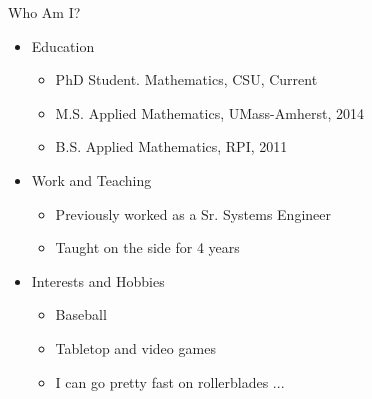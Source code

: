 {}\documentclass[letterpaper,
compress,
xcolor=x11names,
]{beamer}
\begin{document}
\begin{frame}{Who Am I?}
	\begin{itemize}
		\item Education
		\begin{itemize}
			\item PhD Student. Mathematics, CSU, Current
			\item M.S. Applied Mathematics, UMass-Amherst, 2014
			\item B.S. Applied Mathematics, RPI, 2011
		\end{itemize}
		\item Work and Teaching
		\begin{itemize}
			\item Previously worked as a Sr. Systems Engineer
			\item Taught on the side for 4 years
		\end{itemize}
		\item<2-> Interests and Hobbies
		\begin{itemize}
			\item Baseball
			\item Tabletop and video games
			\item<3-> I can go pretty fast on rollerblades ... 
		\end{itemize}
	\end{itemize}
	\begin{center}
	\end{center}
\end{frame}
\end{document}
